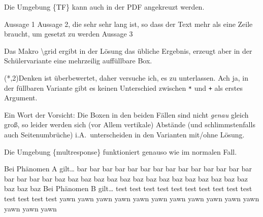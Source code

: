 \documentclass[hyperworksheet]{drcschool}
\newcommand*{\cs}[1]{\textup{\ttfamily\textbackslash#1}}                   %
\newcommand*{\env}[1]{\textup{\ttfamily\{#1\}}}                            %
\begin{document}
\begin{hyperworksheet}
Die Umgebung \env{TF} kann auch in der PDF angekreuzt werden.
\begin{TF}[.8\linewidth]
Aussage 1 \true
\midrule
Aussage 2, die sehr sehr lang ist, so dass der Text mehr als eine Zeile braucht, um gesetzt zu werden \false
\midrule
Aussage 3 \false
\end{TF}

\exercise[Grids]
Das Makro \cs{grid} ergibt in der Lösung das übliche Ergebnis, erzeugt aber in der Schülervariante
eine mehrzeilig auf{}füllbare Box.

\grid(*,2){Denken ist überbewertet, daher versuche ich, es zu unterlassen. Ach ja, in der füllbaren Variante gibt es keinen
Unterschied zwischen \texttt{*} und \texttt{+} als erstes Argument.}

\noindent
Ein Wort der Vorsicht: Die Boxen in den beiden Fällen sind nicht \emph{genau}
gleich groß, so leider werden
sich (vor Allem vertikale) Abstände (und schlimmstenfalls auch Seitenumbrüche) i.A.~unterscheiden
in den Varianten mit/ohne Lösung.

\easy{}
Die Umgebung \env{multresponse} funktioniert genauso wie im normalen Fall.
\begin{multresponse}
\question Bei Phänomen A gilt\ldots
\choice* bar bar bar bar bar bar bar bar bar bar bar bar bar bar bar bar bar bar
\choice* baz baz baz baz baz baz baz baz baz baz baz baz baz baz baz baz baz baz
\question Bei Phänomen B gilt\ldots
\choice* test test test test test test test test test test test test test test
\choice yawn yawn yawn yawn yawn yawn yawn yawn yawn yawn yawn yawn yawn yawn
\end{multresponse}


\end{hyperworksheet}
\end{document}
